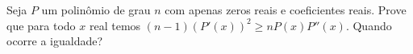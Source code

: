 Seja \(P\) um polinômio de grau \(n\) com apenas zeros reais e coeficientes reais. Prove que para todo \(x\) real temos \((n-1)(P'(x))^2\ge nP(x)P''(x)\). Quando ocorre a igualdade?
